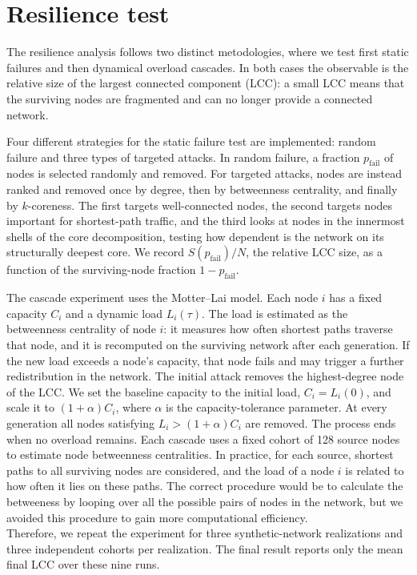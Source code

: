 \section{Resilience test}

The resilience analysis follows two distinct metodologies, where we test first static failures and then dynamical overload
cascades. In both cases the observable is the
relative size of the largest connected component (LCC): a small LCC means that
the surviving nodes are fragmented and can no longer
provide a connected network.


Four different strategies for the static failure test are implemented: random failure and three types of targeted attacks.
In random failure, a fraction $p_{\mathrm{fail}}$ of nodes is selected randomly and removed. For targeted attacks, nodes are instead ranked and removed once by
degree, then by betweenness centrality, and finally by $k$-coreness. The first targets well-connected nodes, the second targets nodes important for
shortest-path traffic, and the third looks at nodes in the innermost shells of
the core decomposition, testing how dependent is the network on its structurally deepest core. We record $S(p_{\mathrm{fail}})/N$, the relative LCC
size, as a function of the surviving-node fraction
$1-p_{\mathrm{fail}}$.




The cascade experiment uses the Motter--Lai model. Each node $i$ has a fixed
capacity $C_i$ and a dynamic load $L_i(\tau)$. The load is estimated as the
betweenness centrality of node $i$: it measures how often shortest paths traverse that node, and it is recomputed on the
surviving network after each generation. If the new load exceeds a node's capacity, that node fails and may
trigger a further redistribution in the network.
The initial attack removes the highest-degree node of the LCC. We set the
baseline capacity to the initial load, $C_i=L_i(0)$, and scale it to
$(1+\alpha)C_i$, where $\alpha$ is the capacity-tolerance parameter. At every
generation all nodes satisfying $L_i>(1+\alpha)C_i$ are removed. The process
ends when no overload remains. 
Each cascade uses a fixed cohort of 128 source nodes to estimate node betweenness centralities. In practice, 
for each source, shortest paths to all surviving nodes are considered, and the load of a node $i$ is related to how often it lies on these paths. The correct procedure would be to calculate the betweeness by looping
over all the possible pairs of nodes in the network, but we avoided this procedure to gain more computational efficiency. \\
Therefore, we repeat the experiment for three synthetic-network realizations
and three independent cohorts per realization. The final result reports only the mean
final LCC over these nine runs. 


